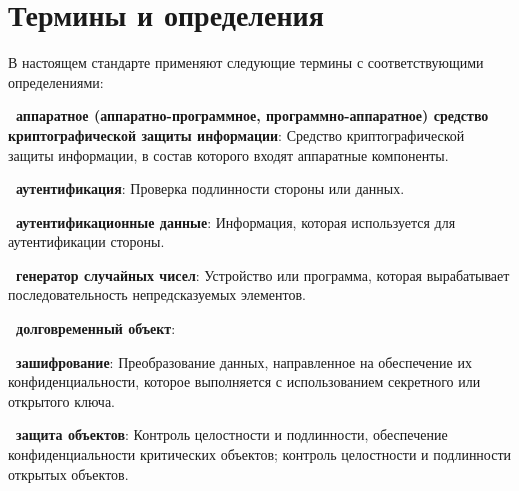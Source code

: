 \chapter{Термины и определения}\label{Terms}

В настоящем стандарте применяют  
%
%
следующие термины с соответствующими определениями:

{\bf \thedefctr~аппаратное (аппаратно-программное, 
программно-аппаратное) средство криптографической защиты информации}:
Средство криптографической защиты информации, в состав которого входят 
аппаратные компоненты. 

{\bf \thedefctr~аутентификация}:
Проверка подлинности стороны или данных.


%
%

{\bf \thedefctr~аутентификационные данные}:
Информация, которая используется для аутентификации стороны.


{\bf \thedefctr~генератор случайных чисел}:
Устройство или программа, которая вырабатывает последовательность 
непредсказуемых элементов.


{\bf \thedefctr~долговременный объект}:


{\bf \thedefctr~зашифрование}:
Преобразование данных, направленное на обеспечение их конфиденциальности,
которое выполняется с использованием секретного или открытого ключа.

{\bf \thedefctr~защита объектов}:
Контроль целостности и подлинности, обеспечение конфиденциальности критических
объектов; контроль целостности и подлинности открытых объектов.

